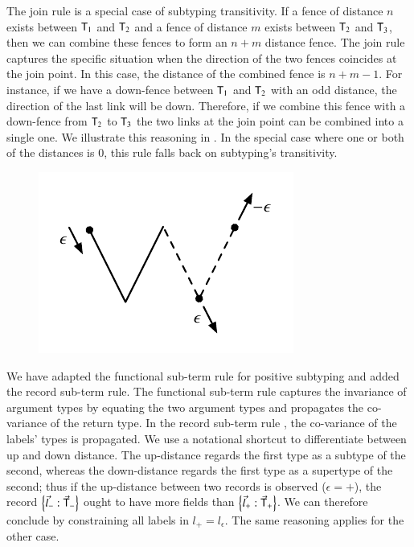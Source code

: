 \documentclass{report}
\begin{document}
  The join rule \dcjoin is a special case of subtyping transitivity. If a fence of distance
  $n$ exists between $\textsf{T}_1$ and $\textsf{T}_2$ and a fence of distance $m$ exists
  between $\textsf{T}_2$ and $\textsf{T}_3$, then we can combine these fences to form an $n+m$
  distance fence. The join rule captures the specific situation when the direction of the two fences coincides
  at the join point. In this case, the distance of the combined fence is $n+m-1$.
  For instance, if we have a down-fence between $\textsf{T}_1$ and $\textsf{T}_2$ with an
  odd distance, the direction of the last link will be down. Therefore, if we combine
  this fence with a down-fence from $\textsf{T}_2$ to $\textsf{T}_3$ the two links at the join
  point can be combined into a single one. We illustrate this reasoning in . In the special case where one or both of the distances is $0$,
  this rule falls back on subtyping's transitivity.
  \begin{figure}[ht]
    \centering
    \includegraphics{images/dcjoin}
    \caption{\dcjoin}
  \end{figure}
  We have adapted the functional sub-term rule for positive subtyping and added the
  record sub-term rule. The functional sub-term rule \dcsubfun captures the invariance of argument types by
  equating the two argument types and propagates the co-variance of the return type.
  In the record sub-term rule \dcsubrec, the co-variance of the labels' types is propagated.
  We use a notational shortcut to differentiate between up and down distance. The up-distance regards
  the first type as a subtype of the second, whereas the down-distance regards the first type
  as a supertype of the second; thus if the
  up-distance between two records is observed ($\epsilon=+$), the record $\left\{\vec{l}_-:\vec{\textsf{T}}_-\right\}$
  ought to have more fields than $\left\{\vec{l}_+:\vec{\textsf{T}}_+\right\}$. We can therefore conclude by
  constraining all labels in $l_+=l_\epsilon$. The same reasoning applies for the other case.
\end{document}
